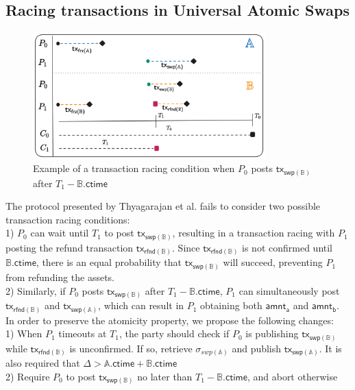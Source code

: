 \documentclass{article}      	%
\begin{document}
\newpage 
\subsection{Racing transactions in Universal Atomic Swaps}


\begin{figure}[H]
    \centering
    \includegraphics[width=0.8\textwidth]{timeouts-uas.png}
    \caption{Example of a transaction racing condition when $P_0$ posts $\mathsf{tx_{swp(\mathbb{B})}}$ after $T_1 - \mathbb{B}.\mathsf{ctime}$}
\end{figure}

The protocol presented by Thyagarajan et al. \cite{uas} fails to consider two possible transaction racing conditions: \\
1) $P_0$ can wait until $T_1$ to post $\mathsf{tx_{swp(\mathbb{B})}}$, resulting in a transaction racing with $P_1$ posting the refund transaction $\mathsf{tx_{rfnd(\mathbb{B})}}$. Since $\mathsf{tx_{rfnd(\mathbb{B})}}$ is not confirmed until $\mathbb{B}.\mathsf{ctime}$, there is an equal probability that $\mathsf{tx_{swp(\mathbb{B})}}$ will succeed, preventing $P_1$ from refunding the assets. \\
2) Similarly, if $P_0$ posts $\mathsf{tx_{swp(\mathbb{B})}}$ after $T_1 - \mathbb{B}.\mathsf{ctime}$, $P_1$ can simultaneously post $\mathsf{tx_{rfnd(\mathbb{B})}}$ and $\mathsf{tx_{swp(\mathbb{A})}}$, which can result in $P_1$ obtaining both $\mathsf{amnt_a}$ and $\mathsf{amnt_b}$. \\

In order to preserve the atomicity property, we propose the following changes: \\
1) When $P_1$ timeouts at $T_1$, the party should check if $P_0$ is publishing $\mathsf{tx_{swp(\mathbb{B})}}$ while $\mathsf{tx_{rfnd(\mathbb{B})}}$ is unconfirmed. If so, retrieve $\sigma_{swp(\mathbb{A})}$ and publish $\mathsf{tx_{swp(\mathbb{A})}}$. It is also required that $\Delta > \mathbb{A}.\mathsf{ctime} + \mathbb{B}.\mathsf{ctime}$ \\
2) Require $P_0$ to post $\mathsf{tx_{swp(\mathbb{B})}}$ no later than $T_1 - \mathbb{B}.\mathsf{ctime}$, and abort otherwise 
\end{document}
